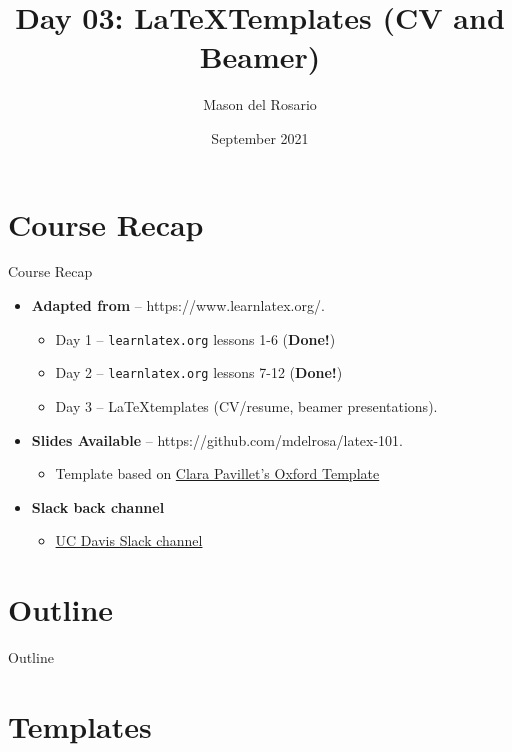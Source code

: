 \documentclass{beamer}
\title{Day 03: \LaTeX \;Templates (CV and Beamer)}
\author{\small{Mason del Rosario}}
\institute{\LaTeX 101}
\date{September 2021} %
\begin{document}
\footnotesize{
% 


{ 
\frame{\titlepage}}

  \section*{Course Recap}

  \begin{frame}{Course Recap}
    \begin{itemize} 
      \item \textbf{Adapted from} -- https://www.learnlatex.org/. 
        \begin{itemize}
          \item Day 1 -- \texttt{learnlatex.org} lessons 1-6 (\textbf{Done!})
          \item Day 2 -- \texttt{learnlatex.org} lessons 7-12 (\textbf{Done!})
          \item Day 3 -- \LaTeX templates (CV/resume, beamer presentations).
        \end{itemize}
      \item \textbf{Slides Available} -- https://github.com/mdelrosa/latex-101.
      \begin{itemize}
        \item Template based on \href{https://www.overleaf.com/latex/templates/oxpav/xnjgrxthvjhg}{Clara Pavillet's Oxford Template}
      \end{itemize}
      \item \textbf{Slack back channel}
      \begin{itemize}
        \item \href{https://join.slack.com/share/zt-ul82okyc-SI2GftuwPx_lFyBXll9rjw}{UC Davis Slack channel}
      \end{itemize}
    \end{itemize}
  \end{frame}

  \section*{Outline}\begin{frame}{Outline}\tableofcontents\end{frame}

  \section{Templates}

}
\end{document}
